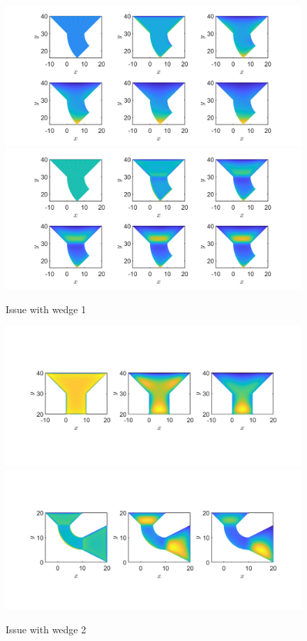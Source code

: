\documentclass[11pt, a4paper]{article}
\theoremstyle{definition}
\begin{document}
	\begin{figure}[h]
		\centering
		\includegraphics[scale=0.35]{demo2.png}
		\includegraphics[scale=0.35]{demo1.png}
		\caption{Issue with wedge 1} 
		\label{F2}
	\end{figure}
		\begin{figure}[h]
		\centering
		\includegraphics[scale=0.35]{demo3.png}
		\includegraphics[scale=0.35]{demo4.png}
		\caption{Issue with wedge 2} 
		\label{F2a}
	\end{figure}
\end{document}
